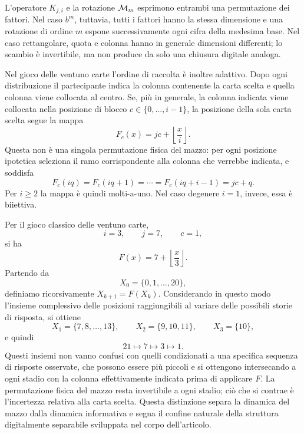 	L'operatore \(K_{j,i}\) e la rotazione \(\mathcal M_m\) esprimono entrambi una
	permutazione dei fattori. Nel caso \(b^m\), tuttavia, tutti i fattori hanno la
	stessa dimensione e una rotazione di ordine \(m\) espone successivamente ogni
	cifra della medesima base. Nel caso rettangolare, quota e colonna hanno in
	generale dimensioni differenti; lo scambio è invertibile, ma non produce da
	solo una chiusura digitale analoga.

	Nel gioco delle ventuno carte l'ordine di raccolta è inoltre adattivo. Dopo
	ogni distribuzione il partecipante indica la colonna contenente la carta
	scelta e quella colonna viene collocata al centro. Se, più in generale, la
	colonna indicata viene collocata nella posizione di blocco
	\(c\in\{0,\dots,i-1\}\), la posizione della sola carta scelta segue la mappa
	\[
	F_c(x)
	=
	jc+\left\lfloor\frac{x}{i}\right\rfloor.
	\]
	Questa non è una singola permutazione fisica del mazzo: per ogni posizione
	ipotetica seleziona il ramo corrispondente alla colonna che verrebbe indicata,
	e soddisfa
	\[
	F_c(iq)=F_c(iq+1)=\cdots=F_c(iq+i-1)=jc+q.
	\]
	Per \(i\geq2\) la mappa è quindi molti-a-uno. Nel caso degenere \(i=1\),
	invece, essa è biiettiva.

	Per il gioco classico delle ventuno carte,
	\[
	i=3,
	\qquad
	j=7,
	\qquad
	c=1,
	\]
	si ha
	\[
	F(x)=7+\left\lfloor\frac{x}{3}\right\rfloor.
	\]
	Partendo da
	\[
	X_0=\{0,1,\dots,20\},
	\]
	definiamo ricorsivamente \(X_{k+1}=F(X_k)\). Considerando in questo modo
	l'insieme complessivo delle posizioni raggiungibili al variare delle possibili
	storie di risposta, si ottiene
	\[
	X_1=\{7,8,\dots,13\},
	\qquad
	X_2=\{9,10,11\},
	\qquad
	X_3=\{10\},
	\]
	e quindi
	\[
	21\longmapsto7\longmapsto3\longmapsto1.
	\]
	Questi insiemi non vanno confusi con quelli condizionati a una specifica
	sequenza di risposte osservate, che possono essere più piccoli e si ottengono
	intersecando a ogni stadio con la colonna effettivamente indicata prima di
	applicare \(F\). La permutazione fisica del mazzo resta invertibile a ogni
	stadio; ciò che si contrae è l'incertezza relativa alla carta scelta. Questa distinzione separa
	la dinamica del mazzo dalla dinamica informativa e segna il confine naturale
	della struttura digitalmente separabile sviluppata nel corpo dell'articolo.

